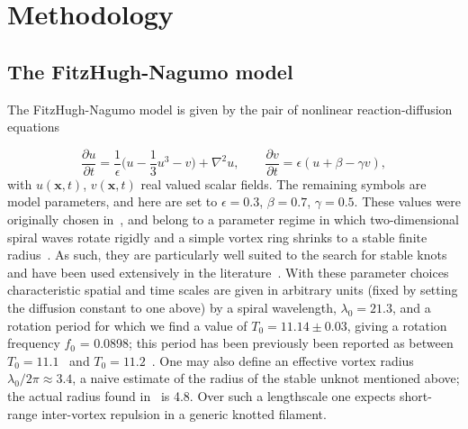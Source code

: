 \section{\label{sec:Methodology} Methodology}

\subsection{The FitzHugh-Nagumo model}
The FitzHugh-Nagumo model is given by the pair of nonlinear reaction-diffusion equations

\begin{equation}
\label{eq:FN}
\frac{\partial u}{ \partial t} = \frac{1}{\epsilon}\biggl(u - \frac{1}{3}u^3 -v\biggr) + \nabla^{2} u,\hspace{2em}    \frac{\partial v}{ \partial t} = {\epsilon}(u + \beta -\gamma v) ,
\end{equation}
with $u(\mathbf{x},t)$, $ v(\mathbf{x},t)$ real valued scalar fields. The remaining symbols are model parameters, and here are set to $\epsilon = 0.3$, $\beta=0.7$, $\gamma = 0.5$. These values were originally chosen in~\citep{Henze1993}, and belong to a parameter regime in which two-dimensional spiral waves rotate rigidly and a simple vortex ring shrinks to a stable finite radius~\citep{Courtemanche1990}. As such, they are particularly well suited to the search for stable knots and have been used extensively in the literature~\citep{Henze1993,WinfreeChapter,Sutcliffe2003,Maucher2016,Maucher2017,Maucher2018,Maucher2019}. With these parameter choices characteristic spatial and time scales are given in arbitrary units (fixed by setting the diffusion constant to one above) by a spiral wavelength, $\lambda_0 = 21.3$, and a rotation period for which we find a value of $T_0=11.14 \pm 0.03$, giving a rotation frequency $f_0$ = 0.0898; this period has been previously been reported as between $T_0 = 11.1$~\citep{Henze1993} and $T_0= 11.2$~\citep{Sutcliffe2003}. One may also define an effective vortex radius $\lambda_0/2\pi \approx 3.4$, a naive estimate of the radius of the stable unknot mentioned above; the actual radius found in~\citep{Courtemanche1990} is 4.8. Over such a lengthscale one expects short-range inter-vortex repulsion in a generic knotted filament.

